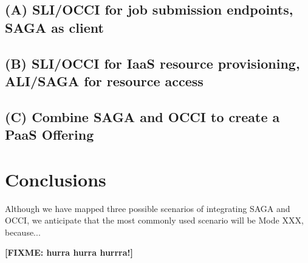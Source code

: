 \documentclass[10pt,conference,final,letterpaper,twoside,twocolumn,]{IEEEtran}
\newcommand{\B}[1]{\textbf{#1}}
\newcommand{\F}[1]{\B{[FIXME: #1]}}
\begin{document}
 \subsection{(A) SLI/OCCI for job submission endpoints, SAGA as client}

  

 \subsection{(B) SLI/OCCI for IaaS resource provisioning, ALI/SAGA for
 resource access} 
 \subsection{(C) Combine SAGA and OCCI to create a PaaS Offering}


\section{Conclusions}

Although we have mapped three possible scenarios of integrating SAGA
and OCCI, we anticipate that the most commonly used scenario will be
Mode XXX, because...


\label{sec:conc}

 \F{hurra hurra hurrra!}




\end{document}

